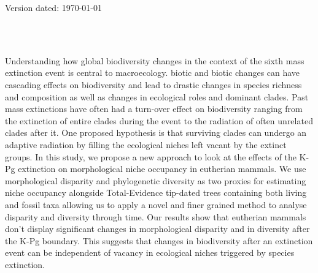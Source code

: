 \documentclass[a4paper,11pt]{article}
\begin{document}
\begin{flushright}
Version dated: \today
\end{flushright}
\begin{center}

\\
\bigskip
\\

\end{center}
Understanding how global biodiversity changes in the context of the sixth mass extinction event is central to macroecology. biotic and biotic changes can have cascading effects on biodiversity and lead to drastic changes in species richness and composition as well as changes in ecological roles and dominant clades. Past mass extinctions have often had a turn-over effect on biodiversity ranging from the extinction of entire clades during the event to the radiation of often unrelated clades after it. One proposed hypothesis is that surviving clades can undergo an adaptive radiation by filling the ecological niches left vacant by the extinct groups.
In this study, we propose a new approach to look at the effects of the K-Pg extinction on morphological niche occupancy in eutherian mammals. We use morphological disparity and phylogenetic diversity as two proxies for estimating niche occupancy alongside Total-Evidence tip-dated trees containing both living and fossil taxa allowing us to apply a novel and finer grained method to analyse disparity and diversity through time.
Our results show that eutherian mammals don't display significant changes in morphological disparity and in diversity after the K-Pg boundary. This suggests that changes in biodiversity after an extinction event can be independent of vacancy in ecological niches triggered by species extinction.
\end{document}
